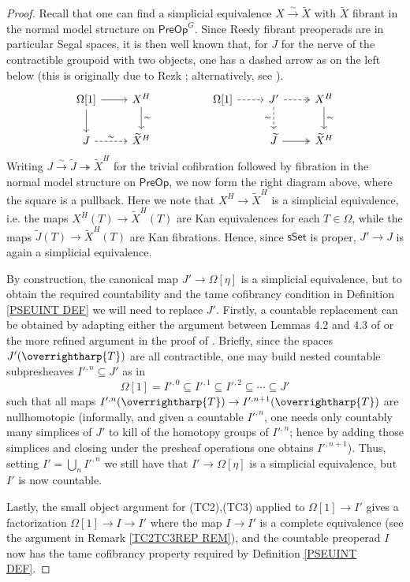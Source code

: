 \documentclass[a4paper,10pt
,draft
]{article}%
\numberwithin{equation}{section}
\numberwithin{figure}{section}
\theoremstyle{definition} %
\newcommand{\vect}[1]{\text{\overrightharp{\ensuremath{#1}}}}
\newcommand{\1}{\ensuremath{\mathbbm 1}}%
\begin{document}
\begin{proof}
	Recall that one can find a simplicial equivalence
	$X \xrightarrow{\sim} \widetilde{X}$
	with $\widetilde{X}$ fibrant in the normal model structure on 
	$\mathsf{PreOp}^G$.
	Since Reedy fibrant preoperads are in particular
	Segal spaces, it is then well known that,
	for $J$ for the nerve of the contractible groupoid
	with two objects,
	one has a dashed arrow as on the left below
	(this is originally due to 
	Rezk \cite[Thm. 6.2]{Rez01}; 
	alternatively, see \cite[Prop. 5.26(iv)]{BP_edss}).
\[
\begin{tikzcd}
	\Omega[1] \ar{r} \ar{d} 
&
	X^H \ar{d}{\sim}
&&
	\Omega[1] \ar[dashed]{r}
&
	J' \ar[dashed,twoheadrightarrow]{r} \ar[dashed]{d}[swap]{\sim} 
&
	X^H \ar{d}{\sim}
\\
	J \ar[dashed]{r}{\sim}
&
	\widetilde{X}^H
&&&
	\widetilde{J} \ar[twoheadrightarrow]{r}
&
	\widetilde{X}^H
\end{tikzcd}
\]	
Writing 
$J \xrightarrow{\sim} 
\widetilde{J} \twoheadrightarrow 
\widetilde{X}^H$
for the trivial cofibration followed by fibration in the normal model structure
on $\mathsf{PreOp}$,
we now form the right diagram above, 
where the square is a pullback.
Here we note that
$X^H \to \widetilde{X}^H$
is a simplicial equivalence,
i.e. the maps
$X^H(T) \to \widetilde{X}^H(T)$
are Kan equivalences for each $T \in \Omega$,
while the maps 
$\widetilde{J}(T) \to \widetilde{X}^H(T)$
are Kan fibrations.
Hence, 
since $\mathsf{sSet}$ is proper, 
$J' \to J$ is again a simplicial equivalence.

By construction, the canonical map 
$J' \to \Omega[\eta]$
is a simplicial equivalence, 
but to obtain the required 
countability and the tame cofibrancy condition in 
Definition \ref{PSEUINT DEF}
we will need to replace $J'$.
Firstly, a countable replacement can be obtained by adapting
either the argument
between Lemmas 4.2 and 4.3 of
\cite{Ber07}
or the more refined argument in the proof of 
\cite[Lemma 5.1.7]{HSS}.
Briefly, since the spaces $J'(\vect{T})$
are all contractible,
one may build nested
countable subpresheaves
$I'^{,n} \subseteq J'$ as in
\[
\Omega[1] = 
I'^{,0} \subseteq
I'^{,1} \subseteq
I'^{,2} \subseteq
\cdots \subseteq
J'
\]
such that all maps 
$I'^{,n}(\vect{T}) \to I'^{,n+1}(\vect{T})$
are nullhomotopic
(informally, and given a countable $I'^{,n}$, 
one needs only countably many simplices of $J'$
to kill of the homotopy groups of $I'^{,n}$; 
hence by adding those simplices and closing under the presheaf operations one obtains $I'^{,n+1}$).
Thus, setting $I' = \bigcup_{n} I'^{,n}$
we still have that $I' \to \Omega[\eta]$
is a simplicial equivalence, 
but $I'$ is now countable.

Lastly, the small object argument for 
(TC2),(TC3) applied to 
$\Omega[1] \to I'$
gives a factorization 
$\Omega[1] \to I \to I'$
where the map $I \to I'$ is a complete equivalence
(see the argument in Remark \ref{TC2TC3REP REM}),
and the countable preoperad $I$
now has the tame cofibrancy property required by 
Definition \ref{PSEUINT DEF}.
\end{proof}
\end{document}
